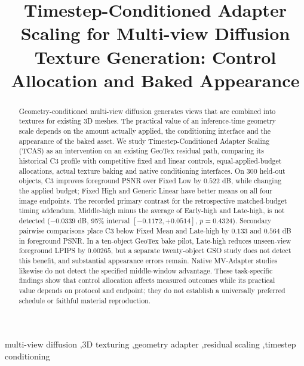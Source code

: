 \documentclass[times,twocolumn,final]{elsarticle}
\begin{document}
\begin{frontmatter}

\title{Timestep-Conditioned Adapter Scaling for Multi-view Diffusion Texture Generation: Control Allocation and Baked Appearance}


\begin{abstract}
Geometry-conditioned multi-view diffusion generates views that are combined into textures for existing 3D meshes. The practical value of an inference-time geometry scale depends on the amount actually applied, the conditioning interface and the appearance of the baked asset. We study Timestep-Conditioned Adapter Scaling (TCAS) as an intervention on an existing GeoTex residual path, comparing its historical C3 profile with competitive fixed and linear controls, equal-applied-budget allocations, actual texture baking and native conditioning interfaces. On 300 held-out objects, C3 improves foreground PSNR over Fixed Low by $0.522$ dB, while changing the applied budget; Fixed High and Generic Linear have better means on all four image endpoints. The recorded primary contrast for the retrospective matched-budget timing addendum, Middle-high minus the average of Early-high and Late-high, is not detected ($-0.0339$ dB, 95\% interval $[-0.1172,+0.0514]$, $p=0.4324$). Secondary pairwise comparisons place C3 below Fixed Mean and Late-high by $0.133$ and $0.564$ dB in foreground PSNR. In a ten-object GeoTex bake pilot, Late-high reduces unseen-view foreground LPIPS by $0.00265$, but a separate twenty-object GSO study does not detect this benefit, and substantial appearance errors remain. Native MV-Adapter studies likewise do not detect the specified middle-window advantage. These task-specific findings show that control allocation affects measured outcomes while its practical value depends on protocol and endpoint; they do not establish a universally preferred schedule or faithful material reproduction.
\end{abstract}

\begin{keyword}
\KWD
multi-view diffusion \sep 3D texturing \sep geometry adapter \sep residual scaling \sep timestep conditioning
\end{keyword}

\end{frontmatter}
\end{document}

